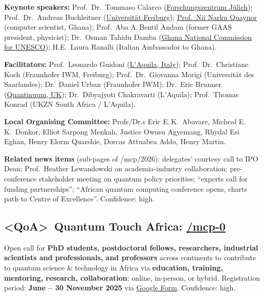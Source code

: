 \documentclass[11pt,a4paper]{article}
\begin{document}
\textbf{Keynote speakers:} Prof.\ Dr.\ Tommaso Calarco (\href{https://www.fz-juelich.de/profile/calarco_t}{Fors\-chungszen\-trum Jülich}); Prof.\ Dr.\ Andreas Buchleitner (\href{https://uni-freiburg.de/frias/prof-dr-andreas-buchleitner}{Universität Freiburg}); \href{https://en.wikipedia.org/wiki/Nii_Quaynor}{Prof.\ Nii Narku Quaynor} (computer scientist, Ghana); Prof.\ Aba A.\,Bentil Andam (former GAAS president, physicist); Dr.\ Osman Tahidu Damba (\href{https://uds.edu.gh/staff/otahidu-62016}{Ghana National Commission for UNESCO}); H.E.\ Laura Ranalli (Italian Ambassador to Ghana).

\textbf{Facilitators:} Prof.\ Leonardo Guidoni (\href{https://dsfc.univaq.it/cbbc/index.php/professors/leonardo-guidoni}{L'Aquila, Italy}); Prof.\ Dr.\ Christiane Koch (Fraunhofer IWM, Freiburg); Prof.\ Dr.\ Giovanna Morigi (Universität des Saarlandes); Dr.\ Daniel Urban (Fraunhofer IWM); Dr.\ Eric Brunner (\href{https://www.linkedin.com/in/eric-brunner-phd/}{Quantinuum, UK}); Dr.\ Dibyajyoti Chakravarti (L'Aquila); Prof.\ Thomas Konrad (UKZN South Africa / L'Aquila).

\textbf{Local Organising Committee:} Profs/Dr.s Eric E.\,K.\ Abavare, Micheal E.\,K.\ Donkor, Elliot Sarpong Menkah, Justice Owusu Agyemang, Rhydal Esi Eghan, Henry Elorm Quarshie, Dorcas Attuabea Addo, Henry Martin.

\textbf{Related news items} (sub-pages of /mcp/2026): delegates' courtesy call to IPO Dean; Prof.\ Heather Lewandowski on academia-industry collaboration; pre-conference stakeholder meeting on quantum policy priorities; ``experts call for funding partnerships''; ``African quantum computing conference opens, charts path to Centre of Excellence''. Confidence: high.

\subsection{\textless QoA\textgreater\ Quantum Touch Africa: \href{https://physics.knust.edu.gh/mcp-0}{/mcp-0}}
Open call for \textbf{PhD students, postdoctoral fellows, researchers, industrial scientists and professionals, and professors} across continents to contribute to quantum science \& technology in Africa via \textbf{education, training, mentoring, research, collaboration}: online, in-person, or hybrid. Registration period: \textbf{June -- 30 November 2025} via \href{https://docs.google.com/forms/d/e/1FAIpQLScpYE8ZQQoEUq6T-ufxIb0TnGgXp-AvABgurAneeF5gKVj4fA/viewform}{Google Form}. Confidence: high.
\end{document}
